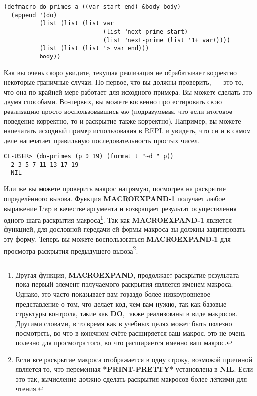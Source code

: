 \begin{lstlisting}
(defmacro do-primes-a ((var start end) &body body)
  (append '(do)
          (list (list (list var
                            (list 'next-prime start)
                            (list 'next-prime (list '1+ var)))))
          (list (list (list '> var end)))
          body))
\end{lstlisting}

Как вы очень скоро увидите, текущая реализация  не обрабатывает корректно
некоторые граничные случаи. Но первое, что вы должны проверить,~--- это то, что она по
крайней мере работает для исходного примера. Вы можете сделать это двумя
способами. Во-первых, вы можете косвенно протестировать свою реализацию просто
воспользовавшись ею (подразумевая, что если итоговое поведение корректно, то и раскрытие
также корректно). Например, вы можете напечатать исходный пример использования
 в REPL и увидеть, что он и в самом деле напечатает правильную
последовательность простых чисел.

\begin{lstlisting}[style=lisprepl]
  CL-USER> (do-primes (p 0 19) (format t "~d " p))
  2 3 5 7 11 13 17 19
  NIL
\end{lstlisting}

Или же вы можете проверить макрос напрямую, посмотрев на раскрытие определённого
вызова. Функция \textbf{MACROEXPAND-1} получает любое выражение Lisp в качестве аргумента
и возвращает результат осуществления одного шага раскрытия макроса\footnote{Другая
  функция, \textbf{MACROEXPAND}, продолжает раскрытие результата пока первый элемент
  получаемого раскрытия является именем макроса. Однако, это часто показывает вам гораздо
  более низкоуровневое представление о том, что делает код, чем вам нужно, так как базовые
  структуры контроля, такие как \textbf{DO}, также реализованы в виде макросов. Другими
  словами, в то время как в учебных целях может быть полезно посмотреть, во что в конечном
  счёте расширяется ваш макрос, это не очень полезно для просмотра того, во что
  расширяется именно ваш макрос.}. Так как \textbf{MACROEXPAND-1} является функцией, для
дословной передачи ей формы макроса вы должны зацитировать эту форму. Теперь вы можете
воспользоваться \textbf{MACROEXPAND-1} для просмотра раскрытия предыдущего
вызова\footnote{Если все раскрытие макроса отображается в одну строку, возможой причиной
  является то, что переменная \textbf{ *PRINT-PRETTY* } установлена в \textbf{NIL}. Если
  это так, вычисление  должно сделать раскрытия макросов
  более лёгкими для чтения.}.

